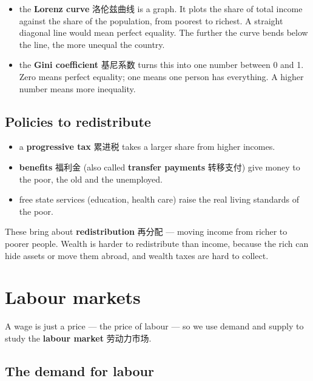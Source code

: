 \documentclass[11pt]{article}
\begin{document}
\begin{itemize}
\item the \textbf{Lorenz curve} 洛伦兹曲线 is a graph. It plots the share of total income against the share of the population, from poorest to richest. A straight diagonal line would mean perfect equality. The further the curve bends below the line, the more unequal the country.

\item the \textbf{Gini coefficient} 基尼系数 turns this into one number between 0 and 1. Zero means perfect equality; one means one person has everything. A higher number means more inequality.

\end{itemize}

\subsection*{Policies to redistribute}

\begin{itemize}
\item a \textbf{progressive tax} 累进税 takes a larger share from higher incomes.

\item \textbf{benefits} 福利金 (also called \textbf{transfer payments} 转移支付) give money to the poor, the old and the unemployed.

\item free state services (education, health care) raise the real living standards of the poor.

\end{itemize}

These bring about \textbf{redistribution} 再分配 — moving income from richer to poorer people. Wealth is harder to redistribute than income, because the rich can hide assets or move them abroad, and wealth taxes are hard to collect.

\section*{Labour markets}

A wage is just a price — the price of labour — so we use demand and supply to study the \textbf{labour market} 劳动力市场.

\subsection*{The demand for labour}
\end{document}
